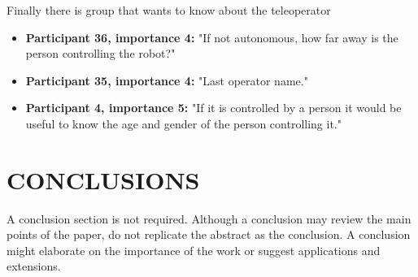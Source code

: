 \documentclass[letterpaper, 10 pt, conference]{ieeeconf}  %
\begin{document}
Finally there is group that wants to know about the teleoperator
\begin{itemize}
    \item  \textbf{Participant 36, importance 4:} "If not autonomous, how far away is the person controlling the robot?"
    \item  \textbf{Participant 35, importance 4:} "Last operator name."
    \item  \textbf{Participant 4, importance 5:} "If it is controlled by a person it would be useful to know the age and gender of the person controlling it."
\end{itemize}


\section{CONCLUSIONS}

A conclusion section is not required. Although a conclusion may review the main points of the paper, do not replicate the abstract as the conclusion. A conclusion might elaborate on the importance of the work or suggest applications and extensions. 

\addtolength{\textheight}{-12cm}   %







\end{document}
